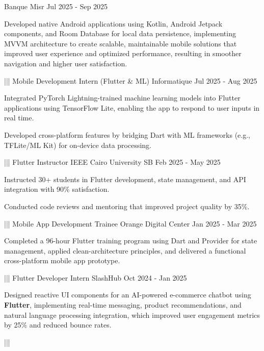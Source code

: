 {    {Banque Misr}%
    {Jul 2025 - Sep 2025}%
    {%
        \item Developed native Android applications using Kotlin, Android Jetpack components, and Room Database for local data persistence, implementing MVVM architecture to create scalable, maintainable mobile solutions that improved user experience and optimized performance, resulting in smoother navigation and higher user satisfaction.
    }%
    |||
    {Mobile Development Intern (Flutter \& ML)}%
    {Informatique}%
    {Jul 2025 - Aug 2025}%
    {%
        \item Integrated PyTorch Lightning-trained machine learning models into Flutter applications using TensorFlow Lite, enabling the app to respond to user inputs in real time.
        \item Developed cross-platform features by bridging Dart with ML frameworks (e.g., TFLite/ML Kit) for on-device data processing.
    }%
    |||
    {Flutter Instructor}%
    {IEEE Cairo University SB}%
    {Feb 2025 - May 2025}%
    {%
        \item Instructed 30+ students in Flutter development, state management, and API integration with 90\% satisfaction.
        \item Conducted code reviews and mentoring that improved project quality by 35\%.
    }%
    |||
    {Mobile App Development Trainee}%
    {Orange Digital Center}%
    {Jan 2025 - Mar 2025}%
    {%
        \item Completed a 96-hour Flutter training program using Dart and Provider for state management, applied clean-architecture principles, and delivered a functional cross-platform mobile app prototype.
    }%
    |||
    {Flutter Developer Intern}%
    {SlashHub}%
    {Oct 2024 - Jan 2025}%
    {%
        \item Designed reactive UI components for an AI-powered e-commerce chatbot using \textbf{Flutter}, implementing real-time messaging, product recommendations, and natural language processing integration, which improved user engagement metrics by 25\% and reduced bounce rates.
    }%
    |||%
}


